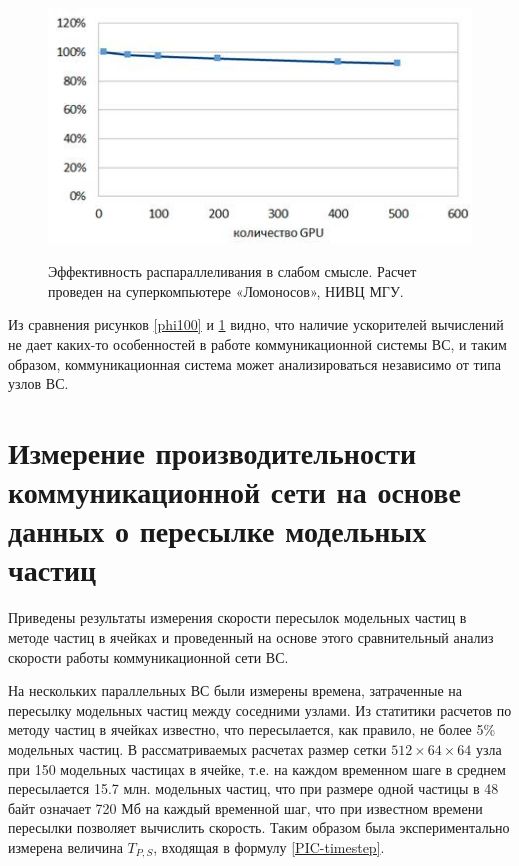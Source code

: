         \begin{figure}[htb]
        	\begin{center}
        		\includegraphics[height=7cm,keepaspectratio]{images/lomonosov_gpu500.jpg}
        	\end{center}
        	\caption{Эффективность распараллеливания в слабом смысле. Расчет проведен на суперкомпьютере «Ломоносов», НИВЦ МГУ.}
        	\label{gpu500}
        \end{figure}
        
        Из сравнения рисунков \ref{phi100} и \ref{gpu500} видно, что наличие ускорителей вычислений не дает каких-то особенностей в работе коммуникационной системы ВС, и таким образом, коммуникационная система может анализироваться независимо от типа узлов ВС.
          
        
        
        
        
        
        
 
        
       
        
        
		\section{Измерение производительности коммуникационной сети на основе данных о пересылке модельных частиц}
		Приведены результаты измерения скорости пересылок модельных частиц в методе частиц в ячейках и проведенный на основе этого сравнительный анализ скорости работы коммуникационной сети ВС.
		
		На нескольких параллельных ВС были измерены времена, затраченные на пересылку модельных частиц между соседними узлами. Из статитики расчетов по методу частиц в ячейках известно, что пересылается, как правило, не более 5\% модельных частиц. В рассматриваемых расчетах размер сетки $512\times 64 \times 64$ узла  при 150 модельных частицах в ячейке, т.е.  на каждом временном шаге в среднем пересылается 15.7 млн. модельных частиц, что при размере одной частицы в 48 байт означает 720 Мб на каждый временной шаг, что при известном времени пересылки позволяет вычислить скорость. Таким образом была экспериментально измерена величина $T_{P,S}$, входящая в формулу \ref{PIC-timestep}.
			
